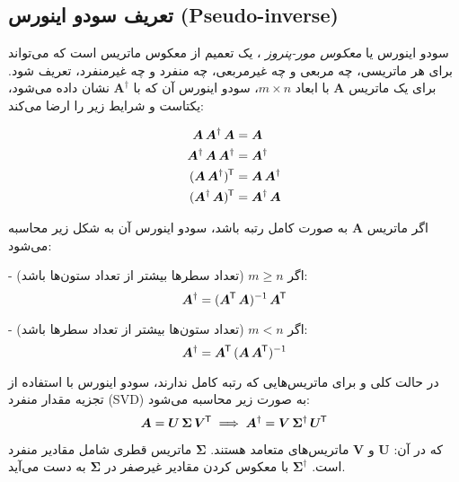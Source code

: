 \documentclass[12pt,onecolumn,a4paper]{article}
\newcommand*{\transpose}{{\mkern-1.5mu\mathsf{T}}}
\begin{document}
	
	
	
	\subsection{تعریف سودو اینورس (Pseudo-inverse)}
	
	
	
	\noindent
	سودو اینورس یا \textit{معکوس مور-پنروز}
	، یک تعمیم از معکوس ماتریس است که می‌تواند برای هر ماتریسی، چه مربعی و چه غیرمربعی، چه منفرد و چه غیرمنفرد، تعریف شود. برای یک ماتریس \( \bm{A} \) با ابعاد \( m \times n \)، سودو اینورس آن که با \( \bm{A}^\dagger \) نشان داده می‌شود، یکتاست و شرایط زیر را ارضا می‌کند:
	
	\begin{align}
		\bm{A} \, \bm{A}^\dagger \, \bm{A} &= \bm{A}
		\\
		\bm{A}^\dagger \, \bm{A} \, \bm{A}^\dagger &= \bm{A}^\dagger
		\\
		(\bm{A} \, \bm{A}^\dagger)^\transpose &= \bm{A} \, \bm{A}^\dagger
		\\
		(\bm{A}^\dagger \, \bm{A})^\transpose &= \bm{A}^\dagger \, \bm{A}
	\end{align}
	
	
	
	\noindent
	اگر ماتریس \( \bm{A} \) به صورت کامل رتبه باشد، سودو اینورس آن به شکل زیر محاسبه می‌شود:
	
	\noindent
	- اگر \( m \geq n \) (تعداد سطرها بیشتر از تعداد ستون‌ها باشد):
	\begin{equation}
		\bm{A}^\dagger = (\bm{A}^\transpose \, \bm{A})^{-1} \, \bm{A}^\transpose
	\end{equation}
	
	\noindent
	- اگر \( m < n \) (تعداد ستون‌ها بیشتر از تعداد سطرها باشد):
	\begin{equation}
		\bm{A}^\dagger = \bm{A}^\transpose \, (\bm{A} \, \bm{A}^\transpose)^{-1}
	\end{equation}
	
	\noindent
	در حالت کلی و برای ماتریس‌هایی که رتبه کامل ندارند، سودو اینورس با استفاده از تجزیه مقدار منفرد (SVD) به صورت زیر محاسبه می‌شود:
	\begin{equation}
		\bm{A} = \bm{U} \, \bm{\Sigma} \, \bm{V}^\transpose \implies \bm{A}^\dagger = \bm{V} \, \bm{\Sigma}^\dagger \, \bm{U}^\transpose
	\end{equation}
	
	که در آن:
	\( \bm{U} \) و \( \bm{V} \) ماتریس‌های متعامد هستند.
	\( \bm{\Sigma} \) ماتریس قطری شامل مقادیر منفرد است.
	\( \bm{\Sigma}^\dagger \) با معکوس کردن مقادیر غیرصفر در \( \bm{\Sigma} \) به دست می‌آید.
	
	
	
	\newpage
	
	
	
	
\end{document}
